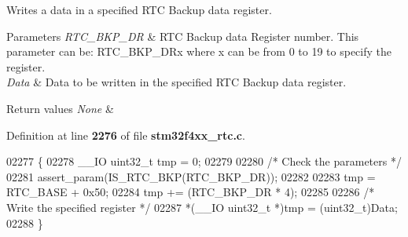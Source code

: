 Writes a data in a specified R\+TC Backup data register. 


\begin{DoxyParams}{Parameters}
{\em R\+T\+C\+\_\+\+B\+K\+P\+\_\+\+DR} & R\+TC Backup data Register number. This parameter can be\+: R\+T\+C\+\_\+\+B\+K\+P\+\_\+\+D\+Rx where x can be from 0 to 19 to specify the register. \\
\hline
{\em Data} & Data to be written in the specified R\+TC Backup data register. \\
\hline
\end{DoxyParams}

\begin{DoxyRetVals}{Return values}
{\em None} & \\
\hline
\end{DoxyRetVals}


Definition at line \textbf{ 2276} of file \textbf{ stm32f4xx\+\_\+rtc.\+c}.


\begin{DoxyCode}
02277 \{
02278   \_\_IO uint32\_t tmp = 0;
02279   
02280   \textcolor{comment}{/* Check the parameters */}
02281   assert_param(IS_RTC_BKP(RTC\_BKP\_DR));
02282 
02283   tmp = RTC_BASE + 0x50;
02284   tmp += (RTC\_BKP\_DR * 4);
02285 
02286   \textcolor{comment}{/* Write the specified register */}
02287   *(\_\_IO uint32\_t *)tmp = (uint32\_t)Data;
02288 \}
\end{DoxyCode}
